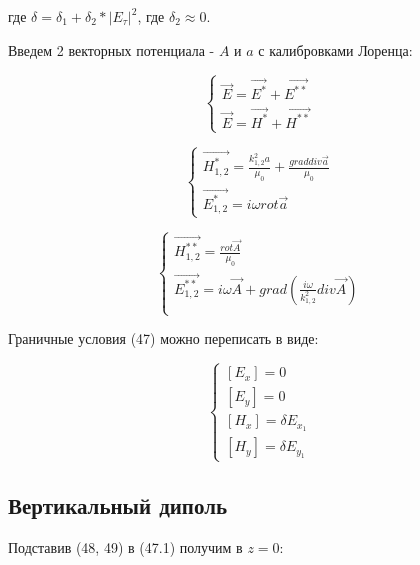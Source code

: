 	где $\delta = \delta_1 + \delta_2 * {|E_{\tau}|}^2$, где $\delta_2 \approx 0$.
	
	
	Введем 2 векторных потенциала - $A$ и $a$ с калибровками Лоренца:
	
	$$\begin{cases}
		\vec{E} = \vec{E^{*}} + \vec{E^{**}} \\
		\vec{E} = \vec{H^{*}} + \vec{H^{**}}
	\end{cases}$$
	
	\begin{equation}
		\begin{cases}
			\vec{H^*_{1, 2}} = \frac{k^2_{1, 2}a}{\mu_0} + \frac{grad div \vec{a}}{\mu_0}  \\
			\vec{E^*_{1, 2}} = i \omega rot \vec{a}
		\end{cases}
	\end{equation}
	
	\begin{equation}
		\begin{cases}
			\vec{H^{**}_{1, 2}} = \frac{rot \vec{A}}{\mu_0} \\
			\vec{E^{**}_{1, 2}} = i \omega \vec{A} + grad(\frac{i \omega}{k^2_{1, 2}} div \vec{A}) \\
		\end{cases}
	\end{equation}
	
	Граничные условия (47) можно переписать в виде:
	
	\begin{equation*}
		\tag{2.1}
		\begin{cases}
			[E_x] = 0 \\
			[E_y] = 0 \\
			[H_x] = \delta E_{x_1} \\
			[H_y] = \delta E_{y_1}
			
		\end{cases}
	\end{equation*}
	
	\subsection{Вертикальный диполь}
	
	Подставив (48, 49) в (47.1) получим в $z = 0$:
	
